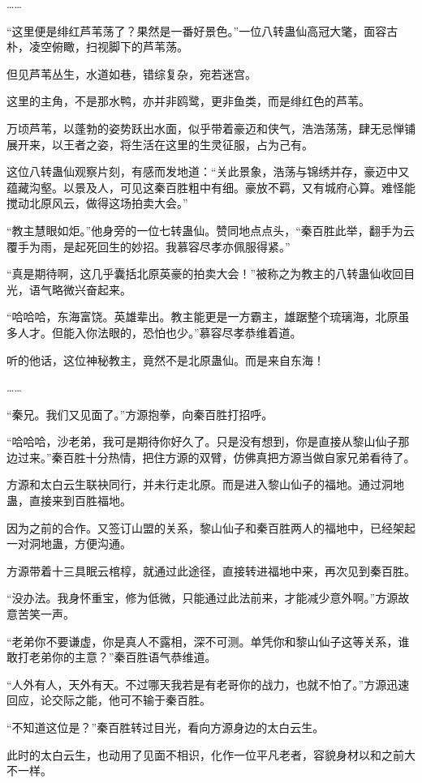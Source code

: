\begin{this_body}
……

“这里便是绯红芦苇荡了？果然是一番好景色。”一位八转蛊仙高冠大氅，面容古朴，凌空俯瞰，扫视脚下的芦苇荡。

但见芦苇丛生，水道如巷，错综复杂，宛若迷宫。

这里的主角，不是那水鸭，亦并非鸥鹭，更非鱼类，而是绯红色的芦苇。

万顷芦苇，以蓬勃的姿势跃出水面，似乎带着豪迈和侠气，浩浩荡荡，肆无忌惮铺展开来，以王者之姿，将生活在这里的生灵征服，占为己有。

这位八转蛊仙观察片刻，有感而发地道：“关此景象，浩荡与锦绣并存，豪迈中又蕴藏沟壑。以景及人，可见这秦百胜粗中有细。豪放不羁，又有城府心算。难怪能搅动北原风云，做得这场拍卖大会。”

“教主慧眼如炬。”他身旁的一位七转蛊仙。赞同地点点头，“秦百胜此举，翻手为云覆手为雨，是起死回生的妙招。我慕容尽孝亦佩服得紧。”

“真是期待啊，这几乎囊括北原英豪的拍卖大会！”被称之为教主的八转蛊仙收回目光，语气略微兴奋起来。

“哈哈哈，东海富饶。英雄辈出。教主能更是一方霸主，雄踞整个琉璃海，北原虽多人才。但能入你法眼的，恐怕也少。”慕容尽孝恭维着道。

听的他话，这位神秘教主，竟然不是北原蛊仙。而是来自东海！

……

“秦兄。我们又见面了。”方源抱拳，向秦百胜打招呼。

“哈哈哈，沙老弟，我可是期待你好久了。只是没有想到，你是直接从黎山仙子那边过来。”秦百胜十分热情，把住方源的双臂，仿佛真把方源当做自家兄弟看待了。

方源和太白云生联袂同行，并未行走北原。而是进入黎山仙子的福地。通过洞地蛊，直接来到百胜福地。

因为之前的合作。又签订山盟的关系，黎山仙子和秦百胜两人的福地中，已经架起一对洞地蛊，方便沟通。

方源带着十三具眠云棺椁，就通过此途径，直接转进福地中来，再次见到秦百胜。

“没办法。我身怀重宝，修为低微，只能通过此法前来，才能减少意外啊。”方源故意苦笑一声。

“老弟你不要谦虚，你是真人不露相，深不可测。单凭你和黎山仙子这等关系，谁敢打老弟你的主意？”秦百胜语气恭维道。

“人外有人，天外有天。不过哪天我若是有老哥你的战力，也就不怕了。”方源迅速回应，论交际之能，他可不输于秦百胜。

“不知道这位是？”秦百胜转过目光，看向方源身边的太白云生。

此时的太白云生，也动用了见面不相识，化作一位平凡老者，容貌身材以和之前大不一样。


\end{this_body}
